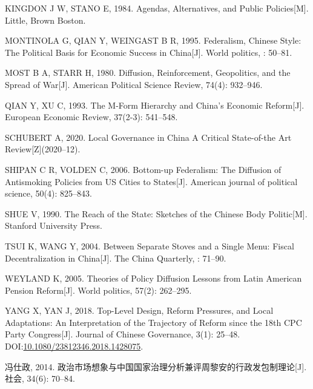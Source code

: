 \documentclass[
  12pt,
]{ctexart}
\newlength{\cslhangindent}
\newlength{\cslentryspacingunit} %
\newenvironment{CSLReferences}[2] %
 {%
  \setlength{\parindent}{0pt}
  \ifodd #1
  \let\oldpar\par
  \def\par{\hangindent=\cslhangindent\oldpar}
  \fi
  \setlength{\parskip}{#2\cslentryspacingunit}
 }%
 {}
\begin{document}
\begin{CSLReferences}{1}{0}
\leavevmode{}%
KINGDON J W, STANO E, 1984. Agendas, Alternatives, and Public Policies{[}M{]}. {Little, Brown Boston}.

\leavevmode{}%
MONTINOLA G, QIAN Y, WEINGAST B R, 1995. Federalism, {Chinese} Style: The Political Basis for Economic Success in {China}{[}J{]}. World politics, : 50--81.

\leavevmode{}%
MOST B A, STARR H, 1980. Diffusion, Reinforcement, Geopolitics, and the Spread of War{[}J{]}. American Political Science Review, 74(4): 932--946.

\leavevmode{}%
QIAN Y, XU C, 1993. The {M}-Form Hierarchy and {China}'s Economic Reform{[}J{]}. European Economic Review, 37(2-3): 541--548.

\leavevmode{}%
SCHUBERT A, 2020. Local {Governance} in {China} \textendash{} {A Critical State}-of-the {Art Review}{[}Z{]}(2020--12).

\leavevmode{}%
SHIPAN C R, VOLDEN C, 2006. Bottom-up Federalism: The Diffusion of Antismoking Policies from {US} Cities to States{[}J{]}. American journal of political science, 50(4): 825--843.

\leavevmode{}%
SHUE V, 1990. The Reach of the State: Sketches of the {Chinese} Body Politic{[}M{]}. {Stanford University Press}.

\leavevmode{}%
TSUI K, WANG Y, 2004. Between Separate Stoves and a Single Menu: Fiscal Decentralization in {China}{[}J{]}. The China Quarterly, : 71--90.

\leavevmode{}%
WEYLAND K, 2005. Theories of Policy Diffusion Lessons from {Latin American} Pension Reform{[}J{]}. World politics, 57(2): 262--295.

\leavevmode{}%
YANG X, YAN J, 2018. Top-Level Design, Reform Pressures, and Local Adaptations: An Interpretation of the Trajectory of Reform since the 18th {CPC Party Congress}{[}J{]}. Journal of Chinese Governance, 3(1): 25--48. DOI:\href{https://doi.org/10.1080/23812346.2018.1428075}{10.1080/23812346.2018.1428075}.

\leavevmode{}%
冯仕政, 2014. 政治市场想象与中国国家治理分析\textemdash\textemdash 兼评周黎安的行政发包制理论{[}J{]}. 社会, 34(6): 70--84.


\end{CSLReferences}
\end{document}
